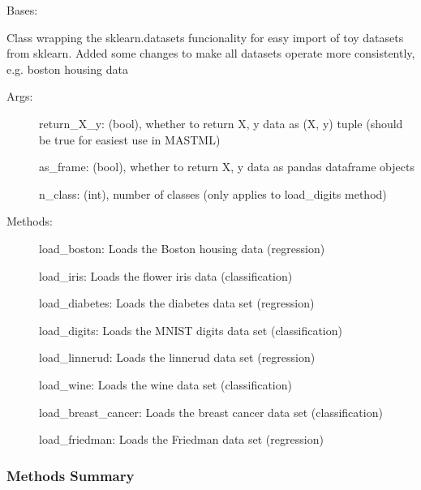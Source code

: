 \documentclass[letterpaper,10pt,english]{sphinxmanual}
\begin{document}
\begin{fulllineitems}
\label{\detokenize{api/mastml.datasets.SklearnDatasets:mastml.datasets.SklearnDatasets}}
Bases: 

Class wrapping the sklearn.datasets funcionality for easy import of toy datasets from sklearn. Added some changes
to make all datasets operate more consistently, e.g. boston housing data
\begin{description}
\item[{Args:}] \leavevmode
return\_X\_y: (bool), whether to return X, y data as (X, y) tuple (should be true for easiest use in MASTML)

as\_frame: (bool), whether to return X, y data as pandas dataframe objects

n\_class: (int), number of classes (only applies to load\_digits method)

\item[{Methods:}] \leavevmode
load\_boston: Loads the Boston housing data (regression)

load\_iris: Loads the flower iris data (classification)

load\_diabetes: Loads the diabetes data set (regression)

load\_digits: Loads the MNIST digits data set (classification)

load\_linnerud: Loads the linnerud data set (regression)

load\_wine: Loads the wine data set (classification)

load\_breast\_cancer: Loads the breast cancer data set (classification)

load\_friedman: Loads the Friedman data set (regression)

\end{description}
\subsubsection*{Methods Summary}


\begin{savenotes}\sphinxatlongtablestart\begin{longtable}[c]{}
\hline

\endfirsthead

%
{}\\
\hline


\end{longtable}
\end{savenotes}
\end{fulllineitems}
\end{document}
